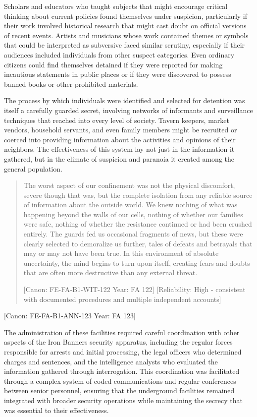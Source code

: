 Scholars and educators who taught subjects that might encourage critical
thinking about current policies found themselves under suspicion,
particularly if their work involved historical research that might cast
doubt on official versions of recent events. Artists and musicians whose
work contained themes or symbols that could be interpreted as subversive
faced similar scrutiny, especially if their audiences included
individuals from other suspect categories. Even ordinary citizens could
find themselves detained if they were reported for making incautious
statements in public places or if they were discovered to possess banned
books or other prohibited materials.

The process by which individuals were identified and selected for
detention was itself a carefully guarded secret, involving networks of
informants and surveillance techniques that reached into every level of
society. Tavern keepers, market vendors, household servants, and even
family members might be recruited or coerced into providing information
about the activities and opinions of their neighbors. The effectiveness
of this system lay not just in the information it gathered, but in the
climate of suspicion and paranoia it created among the general
population.

\begin{quote}
The worst aspect of our confinement was not the physical discomfort,
severe though that was, but the complete isolation from any reliable
source of information about the outside world. We knew nothing of what
was happening beyond the walls of our cells, nothing of whether our
families were safe, nothing of whether the resistance continued or had
been crushed entirely. The guards fed us occasional fragments of news,
but these were clearly selected to demoralize us further, tales of
defeats and betrayals that may or may not have been true. In this
environment of absolute uncertainty, the mind begins to turn upon
itself, creating fears and doubts that are often more destructive than
any external threat.

{[}Canon: FE-FA-B1-WIT-122 \textbar{} Year: FA 122{]} {[}Reliability:
High - consistent with documented procedures and multiple independent
accounts{]}
\end{quote}

{[}Canon: FE-FA-B1-ANN-123 \textbar{} Year: FA 123{]}

The administration of these facilities required careful coordination
with other aspects of the Iron Banner\textquotesingle s security
apparatus, including the regular forces responsible for arrests and
initial processing, the legal officers who determined charges and
sentences, and the intelligence analysts who evaluated the information
gathered through interrogation. This coordination was facilitated
through a complex system of coded communications and regular conferences
between senior personnel, ensuring that the underground facilities
remained integrated with broader security operations while maintaining
the secrecy that was essential to their effectiveness.

